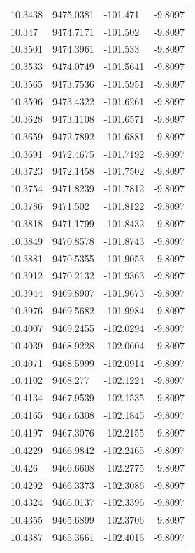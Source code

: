 \begin{table}[H]
\begin{tabular}{llll}
10.3438 & 9475.0381 & -101.471 & -9.8097 \\
10.347 & 9474.7171 & -101.502 & -9.8097 \\
10.3501 & 9474.3961 & -101.533 & -9.8097 \\
10.3533 & 9474.0749 & -101.5641 & -9.8097 \\
10.3565 & 9473.7536 & -101.5951 & -9.8097 \\
10.3596 & 9473.4322 & -101.6261 & -9.8097 \\
10.3628 & 9473.1108 & -101.6571 & -9.8097 \\
10.3659 & 9472.7892 & -101.6881 & -9.8097 \\
10.3691 & 9472.4675 & -101.7192 & -9.8097 \\
10.3723 & 9472.1458 & -101.7502 & -9.8097 \\
10.3754 & 9471.8239 & -101.7812 & -9.8097 \\
10.3786 & 9471.502 & -101.8122 & -9.8097 \\
10.3818 & 9471.1799 & -101.8432 & -9.8097 \\
10.3849 & 9470.8578 & -101.8743 & -9.8097 \\
10.3881 & 9470.5355 & -101.9053 & -9.8097 \\
10.3912 & 9470.2132 & -101.9363 & -9.8097 \\
10.3944 & 9469.8907 & -101.9673 & -9.8097 \\
10.3976 & 9469.5682 & -101.9984 & -9.8097 \\
10.4007 & 9469.2455 & -102.0294 & -9.8097 \\
10.4039 & 9468.9228 & -102.0604 & -9.8097 \\
10.4071 & 9468.5999 & -102.0914 & -9.8097 \\
10.4102 & 9468.277 & -102.1224 & -9.8097 \\
10.4134 & 9467.9539 & -102.1535 & -9.8097 \\
10.4165 & 9467.6308 & -102.1845 & -9.8097 \\
10.4197 & 9467.3076 & -102.2155 & -9.8097 \\
10.4229 & 9466.9842 & -102.2465 & -9.8097 \\
10.426 & 9466.6608 & -102.2775 & -9.8097 \\
10.4292 & 9466.3373 & -102.3086 & -9.8097 \\
10.4324 & 9466.0137 & -102.3396 & -9.8097 \\
10.4355 & 9465.6899 & -102.3706 & -9.8097 \\
10.4387 & 9465.3661 & -102.4016 & -9.8097 \\

\end{tabular}
\end{table}
